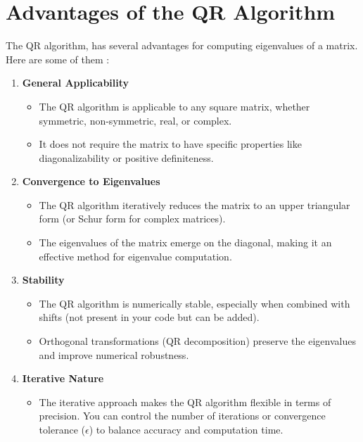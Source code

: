 \documentclass{article}
\begin{document}
\section{Advantages of the QR Algorithm}

The QR algorithm, has several advantages for computing eigenvalues of a matrix. Here are some of them :

\begin{enumerate}
    \item \textbf{General Applicability}
    \begin{itemize}
        \item The QR algorithm is applicable to any square matrix, whether symmetric, non-symmetric, real, or complex.
        \item It does not require the matrix to have specific properties like diagonalizability or positive definiteness.
    \end{itemize}

    \item \textbf{Convergence to Eigenvalues}
    \begin{itemize}
        \item The QR algorithm iteratively reduces the matrix to an upper triangular form (or Schur form for complex matrices).
        \item The eigenvalues of the matrix emerge on the diagonal, making it an effective method for eigenvalue computation.
    \end{itemize}

    \item \textbf{Stability}
    \begin{itemize}
        \item The QR algorithm is numerically stable, especially when combined with shifts (not present in your code but can be added).
        \item Orthogonal transformations (QR decomposition) preserve the eigenvalues and improve numerical robustness.
    \end{itemize}

    \item \textbf{Iterative Nature}
    \begin{itemize}
        \item The iterative approach makes the QR algorithm flexible in terms of precision. You can control the number of iterations or convergence tolerance (\( \epsilon \)) to balance accuracy and computation time.
    \end{itemize}


\end{enumerate}
\end{document}
